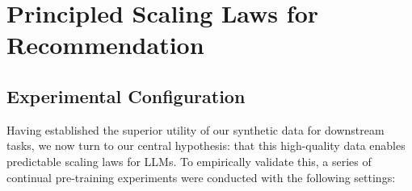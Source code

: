 \documentclass[]{fairmeta}
\newcommand{\jh}[1]{\iftoggle{comment}{\textcolor{orange}{[JH: #1]}}{}}
\begin{document}
\section{Principled Scaling Laws for Recommendation}
\subsection{Experimental Configuration}
Having established the superior utility of our synthetic data for downstream tasks, we now turn to our central hypothesis: that this high-quality data enables predictable scaling laws for LLMs. To empirically validate this, a series of continual pre-training experiments were conducted with the following settings:
\end{document}
